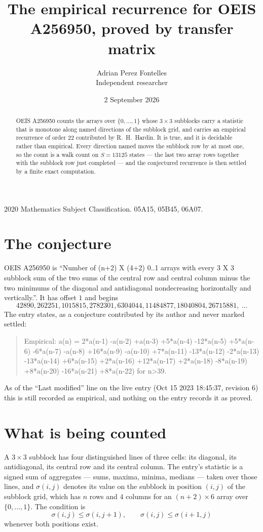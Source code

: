 \documentclass[11pt,a4paper]{article}
\title{The empirical recurrence for OEIS A256950, proved by transfer matrix}
\author{Adrian Perez Fontelles\\ \small Independent researcher}
\date{2 September 2026}
\theoremstyle{plain}
\theoremstyle{definition}
\begin{document}
\maketitle

\begin{abstract}
OEIS A256950 counts the arrays over $\{0,\dots,1\}$ whose $3\times3$ subblocks carry a
statistic that is monotone along named directions of the subblock grid, and carries an
empirical recurrence of order $22$ contributed by R.~H.~Hardin. It is true, and it is
decidable rather than empirical. Every direction named moves the subblock row by at most one,
so the count is a walk count on $S=13125$ states --- the last two array rows together with the
subblock row just completed --- and the conjectured recurrence is then settled by a finite
exact computation.
\end{abstract}

\noindent\small 2020 Mathematics Subject Classification. 05A15, 05B45, 06A07.\normalsize

\section{The conjecture}

OEIS A256950 is ``Number of (n+2) X (4+2) 0..1 arrays with every 3 X 3 subblock sum of the two sums of the central row and central column minus the two minimums of the diagonal and antidiagonal nondecreasing horizontally and vertically.''. It has offset $1$ and begins
\[
42890, 262251, 1015815, 2782301, 6304044, 11484877, 18040804, 26715881,\ \dots
\]
The entry states, as a conjecture contributed by its author and never marked settled:
\begin{quote}
Empirical: a(n) = 2*a(n-1) -a(n-2) +a(n-3) +5*a(n-4) -12*a(n-5) +5*a(n-6) -6*a(n-7) -a(n-8) +16*a(n-9) -a(n-10) +7*a(n-11) -13*a(n-12) -2*a(n-13) -13*a(n-14) +6*a(n-15) +2*a(n-16) +12*a(n-17) +2*a(n-18) -8*a(n-19) +8*a(n-20) -16*a(n-21) +8*a(n-22) for n>39.
\end{quote}
As of the ``Last modified'' line on the live entry (Oct 15 2023 18:45:37, revision 6) this is still
recorded as empirical, and nothing on the entry records it as proved.

\section{What is being counted}

A $3\times3$ subblock has four distinguished lines of three cells: its diagonal, its
antidiagonal, its central row and its central column. The entry's statistic is a signed sum of
aggregates --- sums, maxima, minima, medians --- taken over those lines, and $\sigma(i,j)$
denotes its value on the subblock in position $(i,j)$ of the subblock grid, which has $n$ rows
and $4$ columns for an $(n+2)\times6$ array over $\{0,\dots,1\}$. The condition is
\[
\sigma(i,j)\le\sigma(i,j+1),\qquad \sigma(i,j)\le\sigma(i+1,j)
\]
whenever both positions exist.
\end{document}
